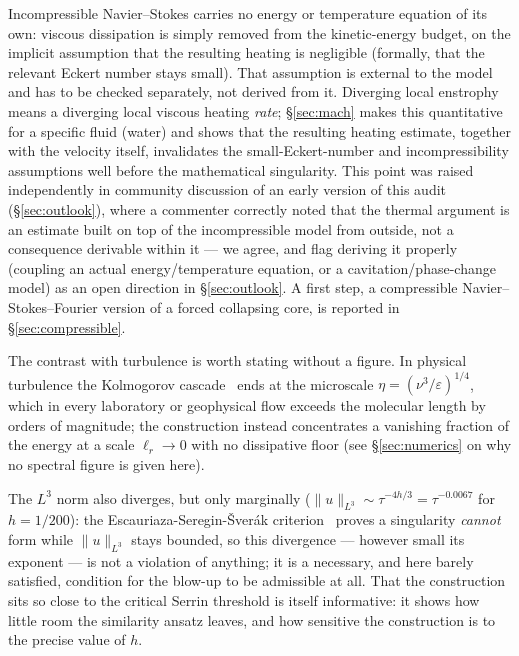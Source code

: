 \documentclass[11pt,a4paper]{article}
\begin{document}
Incompressible Navier--Stokes carries no energy or temperature equation of its own: viscous
dissipation is simply removed from the kinetic-energy budget, on the implicit assumption that the
resulting heating is negligible (formally, that the relevant Eckert number stays small). That
assumption is external to the model and has to be checked separately, not derived from it.
Diverging local enstrophy means a diverging local viscous heating \emph{rate}; \S\ref{sec:mach}
makes this quantitative for a specific fluid (water) and shows that the resulting heating estimate,
together with the velocity itself, invalidates the small-Eckert-number and incompressibility
assumptions well before the mathematical singularity. This point was raised independently in
community discussion of an early version of this audit (\S\ref{sec:outlook}), where a commenter
correctly noted that the thermal argument is an estimate built on top of the incompressible model
from outside, not a consequence derivable within it --- we agree, and flag deriving it properly
(coupling an actual energy/temperature equation, or a cavitation/phase-change model) as an open
direction in \S\ref{sec:outlook}. A first step, a compressible Navier--Stokes--Fourier version of a
forced collapsing core, is reported in \S\ref{sec:compressible}.

The contrast with turbulence is worth stating without a figure. In physical turbulence the
Kolmogorov cascade~\cite{Kolmogorov1941} ends at the microscale $\eta=(\nu^3/\varepsilon)^{1/4}$,
which in every laboratory or geophysical flow exceeds the molecular length by orders of magnitude;
the construction instead concentrates a vanishing fraction of the energy at a scale
$\ell_r\to0$ with no dissipative floor (see \S\ref{sec:numerics} on why no spectral figure is given
here).

The $L^3$ norm also diverges, but only marginally ($\|u\|_{L^3}\sim\tau^{-4h/3}=\tau^{-0.0067}$ for
$h=1/200$): the Escauriaza-Seregin-\v{S}ver\'{a}k criterion~\cite{ESS2003} proves a singularity
\emph{cannot} form while $\|u\|_{L^3}$ stays bounded, so this divergence --- however small its
exponent --- is not a violation of anything; it is a necessary, and here barely satisfied,
condition for the blow-up to be admissible at all. That the construction sits so close to the
critical Serrin threshold is itself informative: it shows how little room the similarity ansatz
leaves, and how sensitive the construction is to the precise value of $h$.

\end{document}
